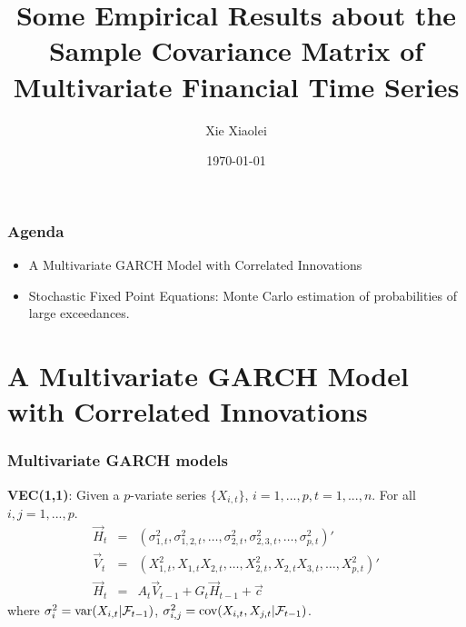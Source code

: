 \documentclass{beamer}
\title{Some Empirical Results about the Sample Covariance Matrix of
  Multivariate Financial Time Series}
\author{Xie Xiaolei} %
\institute[UCPH] %
{
University of Copenhagen \\ %
\medskip
\textit{xie@math.ku.dk} %
}
\date{\today} %
\begin{document}
\begin{frame}
\titlepage %
\end{frame}


\begin{frame}
  \frametitle{Agenda}
  \begin{itemize}
  \item A Multivariate GARCH Model with Correlated Innovations
  \item Stochastic Fixed Point Equations: Monte Carlo estimation of
    probabilities of large exceedances.
  \end{itemize}
\end{frame}

\section{A Multivariate GARCH Model with Correlated Innovations}
\begin{frame}
  \frametitle{Multivariate GARCH models}
  {\bf VEC(1,1)}:
  Given a $p$-variate series $\{X_{i, t}\}$, $i=1,...,p,
  t=1,...,n$. For all $i, j = 1, ..., p$.
  \begin{eqnarray*}
    \vec H_t &=& (\sigma_{1,t}^2, \sigma_{1,2, t}^2, \dots, \sigma_{2,t}^2,
    \sigma_{2,3, t}^2, \dots, \sigma_{p,t}^2)' \\
    \vec V_t &=& (X_{1,t}^2, X_{1, t} X_{2, t}, \dots, X_{2,t}^2,
    X_{2, t} X_{3,t}, \dots, X_{p,t}^2)' \\
    \vec H_t &=& A_t \vec V_{t-1} + G_t \vec H_{t-1} + \vec c
  \end{eqnarray*}
  where $\sigma_i^2 = \text{var}(X_{i, t} | \mathcal F_{t-1})$, $\sigma_{i,j}^2 =
  \text{cov}{(}X_{i,t}, X_{j,t} | \mathcal F_{t-1})$.
\end{frame}
\end{document}

